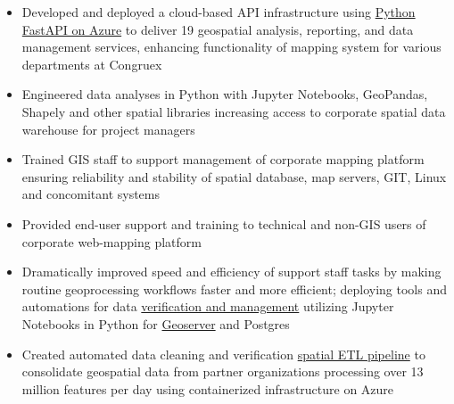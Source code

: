 \documentclass[letterpaper]{article}
\newenvironment{jobtasklist}
        {
            \vspace{-12pt}
            \begin{itemize} \itemsep 0pt
        }{
            \end{itemize}
            \vspace{-3pt}
        }
\newcommand{\impt}[1]{\uline{#1}}
\begin{document}
\begin{jobtasklist}
    \item Developed and deployed a cloud-based API infrastructure using 
        \impt{Python FastAPI on Azure} to deliver 19 geospatial analysis, reporting, and data management
        services, enhancing functionality of mapping system for various departments at
        Congruex

    \item Engineered data analyses in Python with Jupyter Notebooks, GeoPandas, Shapely
            and other spatial libraries
            increasing access to corporate spatial data warehouse for project managers

    \item Trained GIS staff to support management of corporate mapping platform ensuring reliability and stability of
            spatial database, map servers, GIT, Linux and concomitant systems

    \item Provided end-user support and training
            to technical and non-GIS users of corporate web-mapping platform

    \item Dramatically improved speed and efficiency of support staff tasks
            by making routine geoprocessing workflows faster and more efficient;
            deploying tools and automations for data \impt{verification and management}
            utilizing Jupyter Notebooks in Python for \impt{Geoserver} and Postgres

%
%
        \item Created automated data cleaning and verification \impt{spatial ETL pipeline} 
            to consolidate geospatial data
            from partner organizations processing over 13 million features per day
            using containerized infrastructure on Azure



\end{jobtasklist}
\end{document}
